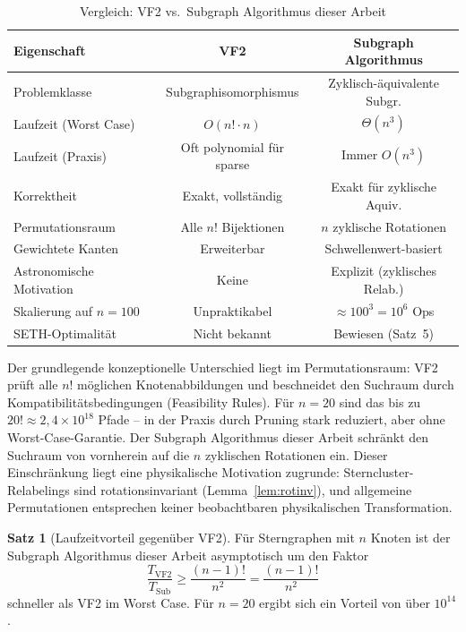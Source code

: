 ﻿\documentclass[a4paper,12pt]{report}
\theoremstyle{definition}
\newtheorem{satz}{Satz}
\begin{document}
\begin{table}[H]
\centering
\caption{Vergleich: VF2 vs.\ Subgraph Algorithmus dieser Arbeit}
\label{tab:vf2}
\begin{tabular}{lcc}
\toprule
Eigenschaft & VF2 & Subgraph Algorithmus \\
\midrule
Problemklasse           & Subgraphisomorphismus & Zyklisch-äquivalente Subgr. \\
Laufzeit (Worst Case)   & $O(n! \cdot n)$             & $\Theta(n^3)$ \\
Laufzeit (Praxis)       & Oft polynomial für sparse   & Immer $O(n^3)$ \\
Korrektheit             & Exakt, vollständig          & Exakt für zyklische Aquiv. \\
Permutationsraum        & Alle $n!$ Bijektionen        & $n$ zyklische Rotationen \\
Gewichtete Kanten       & Erweiterbar                 & Schwellenwert-basiert \\
Astronomische Motivation & Keine                       & Explizit (zyklisches Relab.) \\
Skalierung auf $n=100$  & Unpraktikabel               & $\approx 100^3 = 10^6$ Ops \\
SETH-Optimalität        & Nicht bekannt               & Bewiesen (Satz~5) \\
\bottomrule
\end{tabular}
\end{table}

Der grundlegende konzeptionelle Unterschied liegt im Permutationsraum: VF2 prüft alle $n!$ möglichen Knotenabbildungen und beschneidet den Suchraum durch Kompatibilitätsbedingungen (Feasibility Rules). Für $n = 20$ sind das bis zu $20! \approx 2{,}4 \times 10^{18}$ Pfade -- in der Praxis durch Pruning stark reduziert, aber ohne Worst-Case-Garantie. Der Subgraph Algorithmus dieser Arbeit schränkt den Suchraum von vornherein auf die $n$ zyklischen Rotationen ein. Dieser Einschränkung liegt eine physikalische Motivation zugrunde: Sterncluster-Relabelings sind rotationsinvariant (Lemma~\ref{lem:rotinv}), und allgemeine Permutationen entsprechen keiner beobachtbaren physikalischen Transformation.

\begin{satz}[Laufzeitvorteil gegenüber VF2]
\label{satz:vf2_vorteil}
Für Sterngraphen mit $n$ Knoten ist der Subgraph Algorithmus dieser Arbeit asymptotisch um den Faktor
\[
    \frac{T_\mathrm{VF2}}{T_\mathrm{Sub}} \geq \frac{(n-1)!}{n^2} = \frac{(n-1)!}{n^2}
\]
schneller als VF2 im Worst Case. Für $n = 20$ ergibt sich ein Vorteil von über $10^{14}$.
\end{satz}
\end{document}
